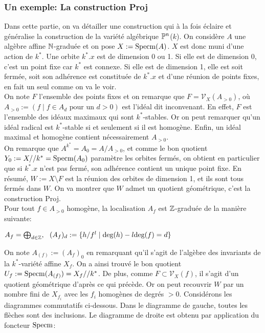 \subsubsection{Un exemple: La construction Proj}
Dans cette partie, on va détailler une construction qui à la fois éclaire et généralise la construction de la variété algébrique $\mathbb{P}^n$($k$). On considère $A$ une algèbre affine $\mathbb{N}$-graduée et on pose $X:=\operatorname{Specm}(A)$. $X$ est donc muni d'une action de $k^*$. Une orbite $k^*.x$ est de dimension 0 ou 1. Si elle est de dimension 0, c'est un point fixe car $k^*$ est connexe. Si elle est de dimension 1, elle est soit fermée, soit son adhérence est constituée de $k^*.x$  et d'une réunion de points fixes, en fait un seul comme on va le voir.\\
On note $F$ l'ensemble des points fixes et on remarque que $F=\mathcal{V}_X(A_{>0})$, où $A_{>0}:=(f\mid f\in A_d \textrm{ pour un }d>0)$ est l'idéal dit inconvenant. En effet, $F$ est l'ensemble des idéaux maximaux qui sont $k^*$-stables. Or on peut remarquer qu'un idéal radical est $k^*$-stable si et seulement si il est homogène. Enfin, un idéal maximal et homogène contient nécessairement $A_{>0}$.\\
On remarque que $A^{k^*}=A_0=A/A_{>0}$, et comme le bon quotient $Y_0:=X//k^*=\operatorname{Specm} (A_0)$ paramètre les orbites fermés, on obtient en particulier que si $k^*.x$ n'est pas fermé, son adhérence contient un unique point fixe. En résumé, $W:=X\setminus F$ est la réunion des orbites de dimension 1, et ils sont tous fermés dans $W$. On va montrer que $W$ admet un quotient géométrique, c'est la construction Proj.\\
Pour tout $f\in A_{>0}$ homogène, la localisation $A_f$ est $\mathbb{Z}$-graduée de la manière suivante:
\begin{center}
 $A_f=\bigoplus_{d\in \mathbb{Z}},\,\,\,\, (A_f)_d:=\lbrace h/f^l\mid \textrm{deg}(h)-l\textrm{deg}(f)=d \rbrace$
\end{center}
On note $A_{(f)}:=(A_f)_0$ en remarquant qu'il s'agit de l'algèbre des invariants de la $k^*$-variété affine $X_f$. On a ainsi trouvé le bon quotient $U_f:=\operatorname{Specm}(A_{(f)})=X_f//k^*$. De plus, comme $F\subset\mathcal{V}_X(f)$,  il s'agit d'un quotient géométrique d'après ce qui précède. Or on peut recouvrir $W$ par un nombre fini de $X_{f_i}$ avec les $f_i$ homogènes de degrés $>0$. Considérons les diagrammes commutatifs ci-dessous. Dans le diagramme de gauche, toutes les flèches sont des inclusions. Le diagramme de droite est obtenu par application du foncteur $\operatorname{Specm}$:
